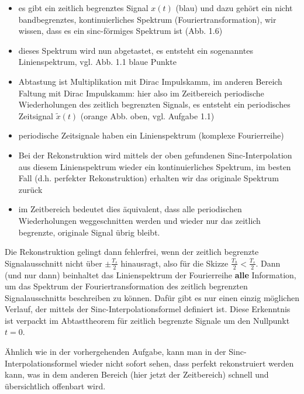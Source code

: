 \begin{itemize}
  \item es gibt ein zeitlich begrenztes Signal $x(t)$ (blau)
  und dazu gehört ein nicht bandbegrenztes, kontinuierliches Spektrum
  (Fouriertransformation), wir wissen, dass es ein sinc-förmiges Spektrum ist (Abb. 1.6)
  \item dieses Spektrum wird nun abgetastet, es entsteht ein sogenanntes
  Linienspektrum, vgl. Abb. 1.1 blaue Punkte
  \item Abtastung ist Multiplikation mit Dirac Impulskamm, im anderen Bereich
  Faltung mit Dirac Impulskamm:
  hier also im Zeitbereich periodische Wiederholungen
  des zeitlich begrenzten Signals, es entsteht ein periodisches Zeitsignal
  $\tilde{x}(t)$ (orange Abb. oben, vgl. Aufgabe 1.1)
  \item periodische Zeitsignale haben ein Linienspektrum (komplexe Fourierreihe)
  \item Bei der Rekonstruktion wird mittels der oben gefundenen Sinc-Interpolation
  aus diesem Linienspektrum wieder ein kontinuierliches Spektrum, im besten
  Fall (d.h. perfekter Rekonstruktion) erhalten wir das originale Spektrum zurück
  \item im Zeitbereich bedeutet dies äquivalent, dass alle periodischen
  Wiederholungen weggeschnitten werden und wieder nur das zeitlich begrenzte,
  originale Signal übrig bleibt.
\end{itemize}
Die Rekonstruktion gelingt dann fehlerfrei, wenn der zeitlich begrenzte
Signalausschnitt nicht über $\pm \frac{T_s}{2}$ hinausragt, also für die Skizze
$\frac{T_h}{2}<\frac{T_s}{2}$. Dann (und nur dann)
beinhaltet das Linienspektrum der Fourierreihe \textbf{alle} Information,
um das Spektrum der Fouriertransformation
des zeitlich begrenzten Signalausschnitts beschreiben zu können. Dafür gibt es
nur einen einzig möglichen Verlauf, der mittels der Sinc-Interpolationsformel
definiert ist. Diese Erkenntnis ist verpackt im Abtasttheorem für
zeitlich begrenzte Signale um den Nullpunkt $t=0$.

Ähnlich wie in der vorhergehenden Aufgabe, kann man in der Sinc-Interpolationsformel
wieder nicht sofort sehen, dass perfekt rekonstruiert werden kann, was in dem anderen
Bereich (hier jetzt der Zeitbereich) schnell und übersichtlich offenbart wird.

\newpage
